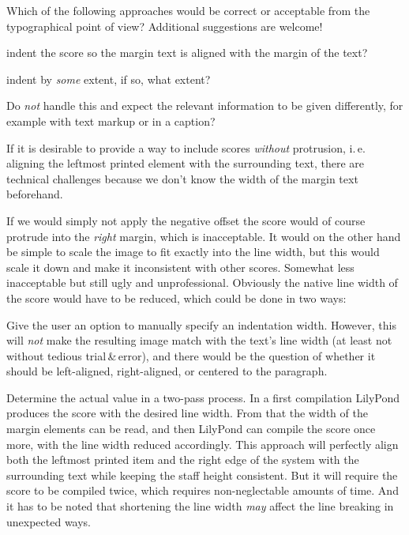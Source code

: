 \documentclass[DIV=12]{scrartcl}
\begin{document}
\bigskip
Which of the following approaches would be correct or acceptable  from the typographical point of view? Additional suggestions are welcome!

\begin{itemize*}
\item indent the score so the margin text is aligned with the margin of the text?
\item indent by \emph{some} extent, if so, what extent?
\item Do \emph{not} handle this and expect the relevant information to be given differently, for example with text markup or in a caption?
\end{itemize*}

If it is desirable to provide a way to include scores \emph{without} protrusion, i.\,e. aligning the leftmost printed element with the surrounding text, there are technical challenges because we don't know the width of the margin text beforehand.

If we would simply not apply the negative offset the score would of course protrude into the \emph{right} margin, which is inacceptable.  It would on the other hand be simple to scale the image to fit exactly into the line width, but this would scale it down and make it inconsistent with other scores.  Somewhat less inacceptable but still ugly and unprofessional. Obviously the native line width of the score would have to be reduced, which could be done in two ways:

\begin{itemize*}
\item Give the user an option to manually specify an indentation width.  However, this will \emph{not} make the resulting image match with the text's line width (at least not without tedious trial\,\&\,error), and there would be the question of whether it should be left-aligned, right-aligned, or centered to the paragraph.
\item Determine the actual value in a two-pass process.  In a first compilation LilyPond produces the score with the desired line width.  From that the width of the margin elements can be read, and then LilyPond can compile the score once more, with the line width reduced accordingly.  This approach will perfectly align both the leftmost printed item and the right edge of the system with the surrounding text while keeping the staff height consistent. But it will require the score to be compiled twice, which requires non-neglectable amounts of time.  And it has to be noted that shortening the line width \emph{may} affect the line breaking in unexpected ways.
\end{itemize*}
\end{document}
